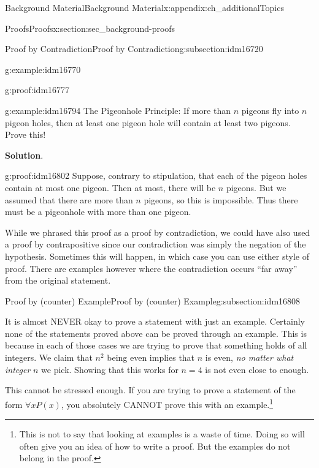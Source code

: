 \documentclass[oneside,10pt,]{book}
\numberwithin{equation}{chapter}
\begin{document}
\begin{appendixptx}{Background Material}{}{Background Material}{}{}{x:appendix:ch_additionalTopics}
\begin{sectionptx}{Proofs}{}{Proofs}{}{}{x:section:sec_background-proofs}
\begin{subsectionptx}{Proof by Contradiction}{}{Proof by Contradiction}{}{}{g:subsection:idm16720}
\begin{example}{}{g:example:idm16770}
\begin{proofptx}{}{g:proof:idm16777}
\end{proofptx}
\end{example}
\begin{example}{}{g:example:idm16794}%
The Pigeonhole Principle: If more than \(n\) pigeons fly into \(n\) pigeon holes, then at least one pigeon hole will contain at least two pigeons. Prove this!%
\par\smallskip%
\noindent\textbf{Solution}.\hypertarget{g:solution:idm16801}{}\quad{}\begin{proofptx}{}{g:proof:idm16802}
Suppose, contrary to stipulation, that each of the pigeon holes contain at most one pigeon. Then at most, there will be \(n\) pigeons. But we assumed that there are more than \(n\) pigeons, so this is impossible. Thus there must be a pigeonhole with more than one pigeon.%
\end{proofptx}
While we phrased this proof as a proof by contradiction, we could have also used a proof by contrapositive since our contradiction was simply the negation of the hypothesis. Sometimes this will happen, in which case you can use either style of proof. There are examples however where the contradiction occurs ``far away'' from the original statement.%
\end{example}
\end{subsectionptx}
%
%
\typeout{************************************************}
\typeout{************************************************}
%
\begin{subsectionptx}{Proof by (counter) Example}{}{Proof by (counter) Example}{}{}{g:subsection:idm16808}
%
\par
It is almost NEVER okay to prove a statement with just an example. Certainly none of the statements proved above can be proved through an example. This is because in each of those cases we are trying to prove that something holds of all integers. We claim that \(n^2\) being even implies that \(n\) is even, \emph{no matter what integer} \(n\) we pick. Showing that this works for \(n = 4\) is not even close to enough.%
\par
This cannot be stressed enough. If you are trying to prove a statement of the form \(\forall x P(x)\), you absolutely CANNOT prove this with an example.\footnote{This is not to say that looking at examples is a waste of time. Doing so will often give you an idea of how to write a proof. But the examples do not belong in the proof.\label{g:fn:idm16822}}%
\par

\end{subsectionptx}
\end{sectionptx}
\end{appendixptx}
\end{document}
